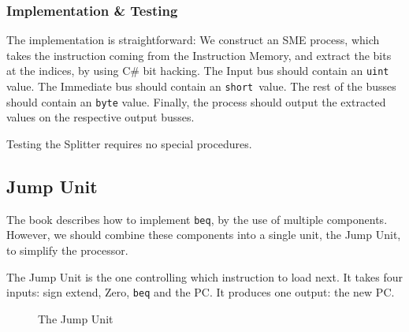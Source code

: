 \subsubsection*{Implementation \& Testing}
The implementation is straightforward: We construct an SME process, which takes
the instruction coming from the Instruction Memory, and extract the bits at the
indices, by using C\# bit hacking. The Input bus should contain an
\texttt{uint} value. The Immediate bus should contain an \texttt{short} value.
The rest of the busses should contain an \texttt{byte} value.  Finally, the
process should output the extracted values on the respective output busses.

Testing the Splitter requires no special procedures.

\subsection{Jump Unit}
The book\cite{ref:ark} describes how to implement \texttt{beq}, by the use of
multiple components. However, we should combine these components into a single
unit, the Jump Unit, to simplify the processor.

The Jump Unit is the one controlling which instruction to load next. It takes
four inputs: sign extend, Zero, \texttt{beq} and the PC. It produces one
output: the new PC.
\begin{figure}
    \centering
    \caption{The Jump Unit}
    \label{fig:jump}
\end{figure}


